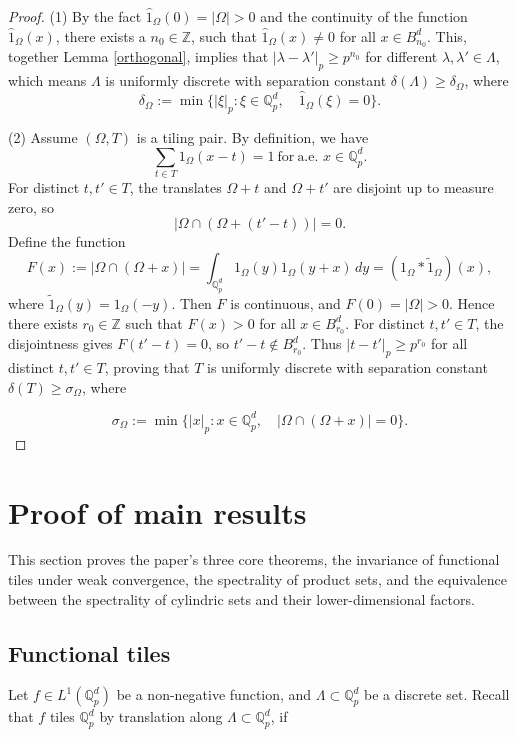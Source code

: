 \documentclass[a4paper,12pt]{amsart}
\def\Q{\mathbb{Q}}
\def\Qp{\mathbb{Q}_p}
\begin{document}
\begin{proof}
(1) By the fact $\widehat{1}_{\Omega}(0)=|\Omega|>0$ and
the continuity of the function $\widehat{1}_{\Omega}(x)$, there exists a $n_0\in \mathbb{Z}$, such that
$\widehat{1}_{\Omega}(x)\neq0$ for all $x\in B_{n_0}^d$. This, together Lemma \ref{orthogonal}, implies
that $|\lambda-\lambda'|_p\geq p^{n_0}$ for different $\lambda,\lambda'\in\Lambda$,
which means $\Lambda$ is uniformly discrete with separation constant $\delta(\Lambda)\geq\delta_\Omega$,
where
\[%
\delta_\Omega:=\min\Big\{|\xi|_p:  \xi\in \Qp^d, \quad \widehat{1}_\Omega(\xi)=0\Big\}.
\]%


(2) Assume $(\Omega,T)$ is a tiling pair. By definition,  we have
\[
\sum_{t \in T} 1_{\Omega}(x - t) = 1\ \text{for} \ \text{a.e. } x \in \Qp^d.
\]
For distinct $t,t'\in T$, the translates $\Omega+t$ and $\Omega+t'$ are disjoint up to measure zero, so
\[
|\Omega\cap(\Omega+(t'-t))|=0.
\]
Define the function
\[
F(x):=|\Omega\cap(\Omega+x)| = \int_{\mathbb{Q}_p^d} 1_\Omega(y)1_\Omega(y+x)\,dy =
(1_\Omega * \widetilde{1}_\Omega)(x),
\]
where $\widetilde{1}_\Omega(y)=1_\Omega(-y)$. Then $F$ is continuous, and $F(0)=|\Omega|>0$.
Hence there exists $r_0\in\mathbb{Z}$ such that $F(x)>0$ for all $x\in B_{r_0}^d$.
For distinct $t,t'\in T$, the disjointness gives $F(t'-t)=0$, so $t'-t\notin B_{r_0}^d$.
Thus $|t-t'|_p \ge p^{r_0}$ for all distinct $t,t'\in T$,
proving that $T$ is uniformly discrete with separation constant $\delta(T)\geq\sigma_\Omega$,
where

\[
\sigma_\Omega:=\min\Big\{|x|_p:  x\in \Qp^d,\quad |\Omega\cap(\Omega+x)| =0\Big\}.
\]

\end{proof}



\section{Proof of main results}\label{main results}
This section proves the paper's three core theorems, the invariance of
functional tiles under weak convergence, the spectrality of product sets, and the equivalence between the
spectrality of cylindric sets and their lower-dimensional factors.

\subsection{Functional tiles}

Let $f\in L^1(\Q_p^d)$ be a non-negative function, and  $\Lambda\subset \Q_p^d$ be a discrete set.
Recall that $f$ tiles $\Q_p^d$ by translation along $\Lambda\subset\Q_p^d$, if
\end{document}
